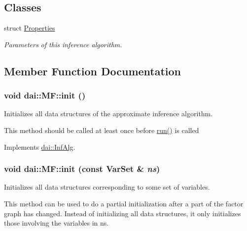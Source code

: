 \subsection*{Classes}
\begin{CompactItemize}
\item 
struct \hyperlink{structdai_1_1MF_1_1Properties}{Properties}
\begin{CompactList}\small\item\em Parameters of this inference algorithm. \item\end{CompactList}\end{CompactItemize}


\subsection{Member Function Documentation}
\hypertarget{classdai_1_1MF_eb993d502d0cb97424ebff82e0cf6839}{
\subsubsection[init]{\setlength{\rightskip}{0pt plus 5cm}void dai::MF::init ()}}
\label{classdai_1_1MF_eb993d502d0cb97424ebff82e0cf6839}


Initializes all data structures of the approximate inference algorithm. 

This method should be called at least once before \hyperlink{classdai_1_1MF_bd9d1de4bfb3fb538c9949a7c82d7984}{run()} is called 

Implements \hyperlink{classdai_1_1InfAlg_99dd53d1aaccf09a4b977a49a983cc85}{dai::InfAlg}.\hypertarget{classdai_1_1MF_49ddd5c9c9f51ee9fb5e153b7194ac71}{
\subsubsection[init]{\setlength{\rightskip}{0pt plus 5cm}void dai::MF::init (const {\bf VarSet} \& {\em ns})}}
\label{classdai_1_1MF_49ddd5c9c9f51ee9fb5e153b7194ac71}


Initializes all data structures corresponding to some set of variables. 

This method can be used to do a partial initialization after a part of the factor graph has changed. Instead of initializing all data structures, it only initializes those involving the variables in ns. 

